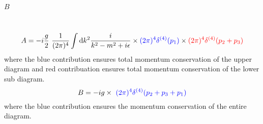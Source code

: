 \documentclass[10pt, a4paper]{article}
\begin{document}
\begin{enumerate}
\begin{enumerate}
{\begin{minipage}{0.45\textwidth}
\begin{center}
\\[0.4cm]            
                $B$
                \end{center}
        \end{minipage}\\[0.4cm]
        }
        $$A = -i\dfrac{g}{2} \ \dfrac{1}{(2\pi)^4}\int \text{d}k^2 \dfrac{i}{k^2 - m^2 +i\epsilon} \times \textcolor{blue}{(2\pi)^4\delta^{(4)}(p_1)} \times \textcolor{red}{(2\pi)^4\delta^{(4)}(p_2+p_3)}$$ where the blue contribution ensures total momentum conservation of the upper diagram and red contribuation ensures total momentum conservation of the lower sub diagram.
        $$B = -ig \times \ \textcolor{blue}{(2\pi)^4\delta^{(4)}(p_2 + p_3 + p_1)}$$
        where the blue contribution ensures the momentum conservation of the entire diagram.
        

\end{enumerate}
\end{enumerate}
\end{document}
